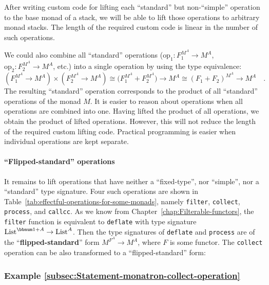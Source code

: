 After writing custom code for lifting each \textsf{``}standard\textsf{''} but non-\textsf{``}simple\textsf{''}
operation to the base monad of a stack, we will be able to lift those
operations to arbitrary monad stacks. The length of the required custom
code is linear in the number of such operations.

We could also combine all \textsf{``}standard\textsf{''} operations ($\text{op}_{1}:F_{1}^{M^{A}}\rightarrow M^{A}$,
$\text{op}_{2}:F_{2}^{M^{A}}\rightarrow M^{A}$, etc.) into a single
operation by using the type equivalence:
\[
(F_{1}^{M^{A}}\rightarrow M^{A})\times(F_{2}^{M^{A}}\rightarrow M^{A})\cong\big(F_{1}^{M^{A}}+F_{2}^{M^{A}}\big)\rightarrow M^{A}\cong(F_{1}+F_{2})^{M^{A}}\rightarrow M^{A}\quad.
\]
The resulting \textsf{``}standard\textsf{''} operation corresponds to the product
of all \textsf{``}standard\textsf{''} operations of the monad $M$. It is easier to
reason about operations when all operations are combined into one.
Having lifted the product of all operations, we obtain the product
of lifted operations. However, this will not reduce the length of
the required custom lifting code. Practical programming is easier
when individual operations are kept separate.

\paragraph{\textquotedblleft Flipped-standard\textquotedblright{} operations}

It remains to lift operations that have neither a \textsf{``}fixed-type\textsf{''},
nor \textsf{``}simple\textsf{''}, nor a \textsf{``}standard\textsf{''} type signature. Four such operations
are shown in Table~\ref{tab:effectful-operations-for-some-monads},
namely \lstinline!filter!, \lstinline!collect!, \lstinline!process!,
and \lstinline!callcc!. As we know from Chapter~\ref{chap:Filterable-functors},
the \lstinline!filter! function is equivalent to \lstinline!deflate!
with type signature $\text{List}^{\bbnum 1+A}\rightarrow\text{List}^{A}$.
Then the type signatures of \lstinline!deflate! and \lstinline!process!
are of the \textsf{``}\textbf{flipped-standard}\textsf{''} form $M^{F^{A}}\rightarrow M^{A}$,
where $F$ is some functor. The \lstinline!collect! operation can
be also transformed to a \textsf{``}flipped-standard\textsf{''} form:

\subsubsection{Example \label{subsec:Statement-monatron-collect-operation}\ref{subsec:Statement-monatron-collect-operation}}

